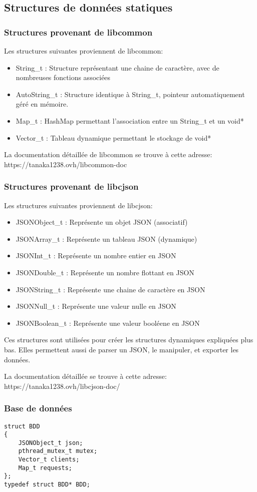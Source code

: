 % 
\subsection{Structures de données statiques}
\subsubsection{Structures provenant de libcommon}
Les structures suivantes proviennent de libcommon:
\begin{itemize}
	\item String\_t : Structure représentant une chaine de caractère, avec de nombreuses fonctions associées
	\item AutoString\_t : Structure identique à String\_t, pointeur automatiquement géré en mémoire.
	\item Map\_t : HashMap permettant l'association entre un String\_t et un void*
	\item Vector\_t : Tableau dynamique permettant le stockage de void*
\end{itemize}
La documentation détaillée de libcommon se trouve à cette adresse:\newline
https://tanaka1238.ovh/libcommon-doc
\par
\subsubsection{Structures provenant de libcjson}
Les structures suivantes proviennent de libcjson:
\begin{itemize}
	\item JSONObject\_t : Représente un objet JSON (associatif)
	\item JSONArray\_t : Représente un tableau JSON (dynamique)
	\item JSONInt\_t : Représente un nombre entier en JSON
	\item JSONDouble\_t : Représente un nombre flottant en JSON
	\item JSONString\_t : Représente une chaine de caractère en JSON
	\item JSONNull\_t : Représente une valeur nulle en JSON
	\item JSONBoolean\_t : Représente une valeur booléene en JSON
\end{itemize}
Ces structures sont utilisées pour créer les structures dynamiques expliquées plus bas.
Elles permettent aussi de parser un JSON, le manipuler, et exporter les données.\par

La documentation détaillée se trouve à cette adresse:\newline
https://tanaka1238.ovh/libcjson-doc/
\subsubsection{Base de données}
\begin{lstlisting}
struct BDD
{
	JSONObject_t json;
	pthread_mutex_t mutex;
	Vector_t clients;
	Map_t requests;
};
typedef struct BDD* BDD;
\end{lstlisting}


% 
